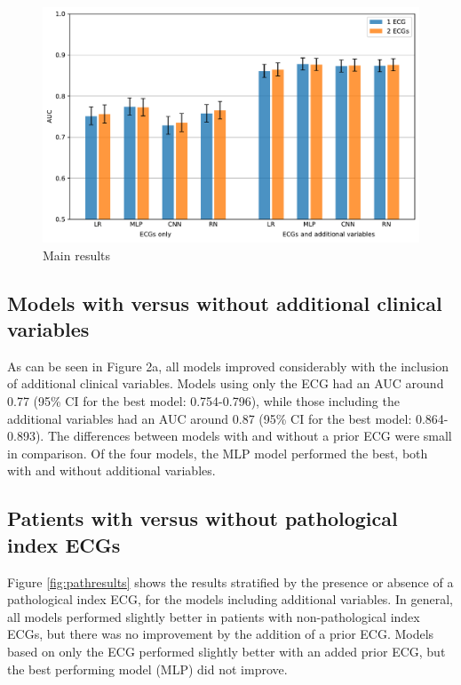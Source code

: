 \documentclass[preprint]{elsarticle}
\begin{document}
\begin{figure}[h!]
    \includegraphics[scale=0.6]{main_results.pdf}
    \caption{Main results}
    \label{fig:mainresults}
\end{figure}

\subsection{Models with versus without additional clinical variables}
As can be seen in Figure 2a, all models improved considerably with the inclusion of additional clinical variables. Models using only the ECG had an AUC around 0.77 (95\% CI for the best model: 0.754-0.796), while those including the additional variables had an AUC around 0.87 (95\% CI for the best model: 0.864-0.893). The differences between models with and without a prior ECG were small in comparison. Of the four models, the MLP model performed the best, both with and without additional variables.

\subsection{Patients with versus without pathological index ECGs}
Figure \ref{fig:pathresults} shows the results stratified by the presence or absence of a pathological index ECG, for the models including additional variables. In general, all models performed slightly better in patients with non-pathological index ECGs, but there was no improvement by the addition of a prior ECG. Models based on only the ECG performed slightly better with an added prior ECG, but the best performing model (MLP) did not improve.
\end{document}

